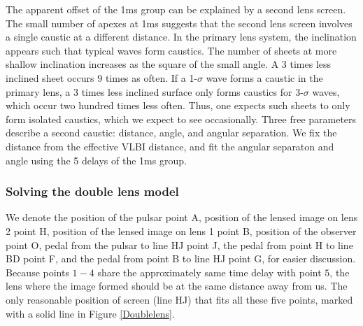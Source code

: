 \documentclass[useAMS,usenatbib]{mn2e}
\begin{document}
The apparent offset of the 1ms group can be explained by a second lens
screen.  The small number of apexes at 1ms suggests that the second
lens screen involves a single caustic at a different distance.  In the
primary lens system, the inclination appears such that typical waves
form caustics.  The number of sheets at more shallow inclination
increases as the square of the small angle.  A 3 times less inclined
sheet occurs 9 times as often.  If a 1-$\sigma$ wave forms a caustic
in the primary lens, a 3 times less inclined surface only forms
caustics for 3-$\sigma$ waves, which occur two hundred times less
often.  Thus, one expects such sheets to only form isolated caustics,
which we expect to see occasionally.  Three free parameters describe a
second caustic: distance, angle, and angular separation.  We fix the
distance from the effective VLBI distance, and fit the angular
separaton and angle using the 5 delays of the 1ms group.

\subsubsection{Solving the double lens model}
We denote the position of the pulsar point A, position of the lensed image on lens 2 point H, position of the lensed image on lens 1 point B, position of the observer point O, pedal from the pulsar to line HJ point J, the pedal from point H to line BD point F, and the pedal from point B to line HJ point G, for easier discussion.
Because points $1-4$ share the approximately same time delay with point $5$, the lens where the image formed should be at the same distance away from us. The only reasonable position of screen (line HJ) that fits all these five points, marked with a solid line in Figure \ref{Doublelens}.  
\end{document}
